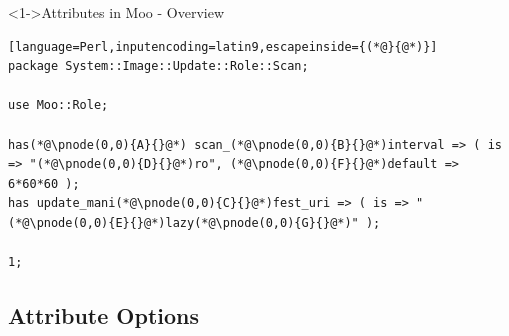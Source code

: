 \documentclass[ngerman,xcolor={table,dvipsnames},smaller,compress,hyperref={bookmarks,colorlinks}]{beamer}%
\begin{document}
\begin{frame}[t,fragile]

\begin{block}<1->{Attributes in Moo - Overview}
\scriptsize
\begin{lstlisting}[language=Perl,inputencoding=latin9,escapeinside={(*@}{@*)}]
package System::Image::Update::Role::Scan;

use Moo::Role;

has(*@\pnode(0,0){A}{}@*) scan_(*@\pnode(0,0){B}{}@*)interval => ( is => "(*@\pnode(0,0){D}{}@*)ro", (*@\pnode(0,0){F}{}@*)default => 6*60*60 );
has update_mani(*@\pnode(0,0){C}{}@*)fest_uri => ( is => "(*@\pnode(0,0){E}{}@*)lazy(*@\pnode(0,0){G}{}@*)" );

1;
\end{lstlisting}
\end{block}

\begin{itemize}
\end{itemize}

\end{frame}

\subsection{Attribute Options}
\end{document}
